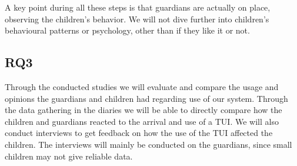 A key point during all these steps is that guardians are actually on place, observing the children's behavior. We will not dive further into children's behavioural patterns or psychology, other than if they like it or not.    
     
 
\subsection{RQ3}
\label{sec: RQ3-methodology}

Through the conducted studies we will evaluate and compare the usage and opinions the guardians and children had regarding use of our system. Through the data gathering in the diaries we will be able to directly compare how the children and guardians reacted to the arrival and use of a TUI. We will also conduct interviews to get feedback on how the use of the TUI affected the children. The interviews will mainly be conducted on the guardians, since small children may not give reliable data.

